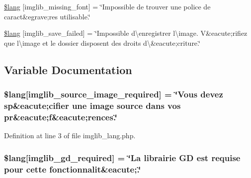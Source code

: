 \begin{DoxyCompactItemize}
\item 
\hyperlink{application_2language_2french_2imglib__lang_8php_a935800aad2be18ca4fe99bb074674848}{\$lang} \mbox{[}\textquotesingle{}imglib\+\_\+missing\+\_\+font\textquotesingle{}\mbox{]} = \char`\"{}Impossible de trouver une police de caract\&egrave;res utilisable.\char`\"{}
\item 
\hyperlink{application_2language_2french_2imglib__lang_8php_a4d7a99fddc60c97a7327fa0125dea264}{\$lang} \mbox{[}\textquotesingle{}imglib\+\_\+save\+\_\+failed\textquotesingle{}\mbox{]} = \char`\"{}Impossible d\textbackslash{}\textquotesingle{}enregistrer l\textbackslash{}\textquotesingle{}image. V\&eacute;rifiez que l\textbackslash{}\textquotesingle{}image et le dossier disposent des droits d\textbackslash{}\textquotesingle{}\&eacute;criture.\char`\"{}
\end{DoxyCompactItemize}


\subsection{Variable Documentation}
\subsubsection[{\texorpdfstring{\$lang}{$lang}}]{\setlength{\rightskip}{0pt plus 5cm}\$lang\mbox{[}\textquotesingle{}imglib\+\_\+source\+\_\+image\+\_\+required\textquotesingle{}\mbox{]} = \char`\"{}Vous devez sp\&eacute;cifier une image source dans vos pr\&eacute;{\bf f}\&eacute;rences.\char`\"{}}\hypertarget{application_2language_2french_2imglib__lang_8php_af48787ab142f633036ebdf1cc5da7409}{}\label{application_2language_2french_2imglib__lang_8php_af48787ab142f633036ebdf1cc5da7409}


Definition at line 3 of file imglib\+\_\+lang.\+php.

\subsubsection[{\texorpdfstring{\$lang}{$lang}}]{\setlength{\rightskip}{0pt plus 5cm}\$lang\mbox{[}\textquotesingle{}imglib\+\_\+gd\+\_\+required\textquotesingle{}\mbox{]} = \char`\"{}La librairie GD est requise pour cette fonctionnalit\&eacute;.\char`\"{}}\hypertarget{application_2language_2french_2imglib__lang_8php_aa8d7f8276e62fbe759daef2021c16552}{}\label{application_2language_2french_2imglib__lang_8php_aa8d7f8276e62fbe759daef2021c16552}


